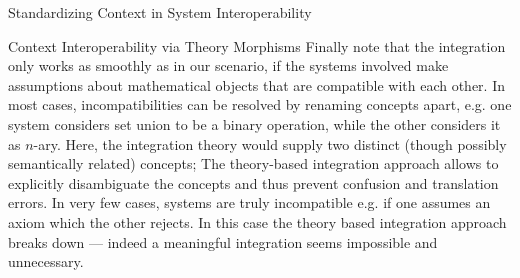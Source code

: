 \begin{omgroup}[id=logics,creators=miko]{Standardizing Context in System Interoperability}
\begin{omgroup}[id=logics.integrating-libraries]{Context Interoperability via Theory  Morphisms}
Finally note that the integration only works as smoothly as in our scenario, if the
systems involved make assumptions about mathematical objects that are compatible with each
other. In most cases, incompatibilities can be resolved by renaming concepts apart,
e.g. one system considers set union to be a binary operation, while the other considers it
as $n$-ary. Here, the integration theory would supply two distinct (though possibly
semantically related) concepts; The theory-based integration approach allows to explicitly
disambiguate the concepts and thus prevent confusion and translation errors. In very few
cases, systems are truly incompatible e.g. if one assumes an axiom which the other
rejects. In this case the theory based integration approach breaks down --- indeed a
meaningful integration seems impossible and unnecessary.
\end{omgroup}


\end{omgroup}

